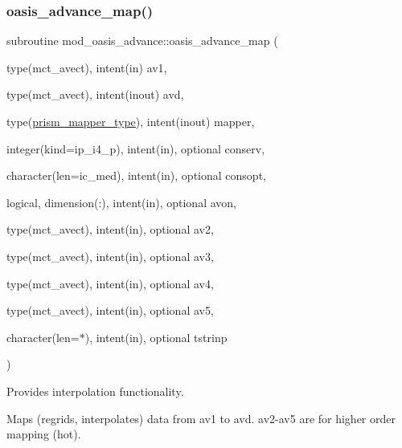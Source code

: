 \subsubsection{\texorpdfstring{oasis\+\_\+advance\+\_\+map()}{oasis\_advance\_map()}}
{\footnotesize\ttfamily subroutine mod\+\_\+oasis\+\_\+advance\+::oasis\+\_\+advance\+\_\+map (\begin{DoxyParamCaption}\item[{type(mct\+\_\+avect), intent(in)}]{av1,  }\item[{type(mct\+\_\+avect), intent(inout)}]{avd,  }\item[{type(\hyperlink{structmod__oasis__map_1_1prism__mapper__type}{prism\+\_\+mapper\+\_\+type}), intent(inout)}]{mapper,  }\item[{integer(kind=ip\+\_\+i4\+\_\+p), intent(in), optional}]{conserv,  }\item[{character(len=ic\+\_\+med), intent(in), optional}]{consopt,  }\item[{logical, dimension(\+:), intent(in), optional}]{avon,  }\item[{type(mct\+\_\+avect), intent(in), optional}]{av2,  }\item[{type(mct\+\_\+avect), intent(in), optional}]{av3,  }\item[{type(mct\+\_\+avect), intent(in), optional}]{av4,  }\item[{type(mct\+\_\+avect), intent(in), optional}]{av5,  }\item[{character(len=$\ast$), intent(in), optional}]{tstrinp }\end{DoxyParamCaption})\hspace{0.3cm}{\ttfamily [private]}}



Provides interpolation functionality. 

Maps (regrids, interpolates) data from av1 to avd. av2-\/av5 are for higher order mapping (hot).


